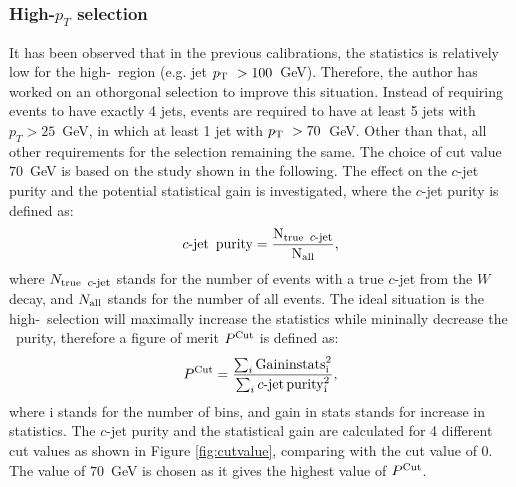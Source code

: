 \documentclass[letterpaper,12pt]{article}
\newcommand\cjetineq{\mathop{\mbox{$c$-$\rm{jet}$}}}
\newcommand\cjetunder{\mathop{\footnotesize{\mbox{$c$-$\rm{jet}$}}}\normalsize}
\begin{document}
\subsubsection{High-$p_T$ selection}
\label{high_pt_selection}
It has been observed that in the previous calibrations, the statistics 
is relatively low for the high-\pt\ region (e.g. jet $p_{\mathrm T}\ > 100$~GeV). 
Therefore, the author has worked on an othorgonal selection to improve this situation.
Instead of requiring events to have exactly 4 jets, events are required to 
have at least 5 jets with $p_{T} > 25$~GeV, in which at least 
1 jet with $p_{\mathrm T}\ > 70$~GeV. Other than that, all 
other requirements for the selection remaining the same. 
The choice of cut value $70$~GeV is based on the
study shown in the following. 
The effect on the $c$-jet purity and the potential statistical gain is investigated, 
where the $c$-jet purity is defined as:
\begin{equation}
\cjetineq\ \rm{purity} = \frac{N_{\rm{true}\ \cjetunder}}{N_{\rm{all}}},
\end{equation}
where $N_{\rm{true}\ \cjetunder}$ stands for the number of events with a 
true $c$-jet from the $W$ decay, and $N_{\rm{all}}$ stands for the number of all events. 
The ideal situation is the high-\pt\ selection will maximally increase the 
statistics while mininally decrease the \cjet\ purity, therefore a figure of merit $P^{\rm{Cut}}$
is defined as:
\[P^{\rm{Cut}} = \frac{\sum_i{\rm{Gain in stats}^2_i}}{\sum_i{\cjetineq \rm{purity}^2_i }}, \]
where i stands for the number of bins, and gain in stats stands for increase in 
statistics.
The $c$-jet purity and the statistical gain are calculated for 4 different cut 
values as shown in Figure \ref{fig:cutvalue}, comparing with the cut value of 0. 
The value of $70$~GeV is chosen as it gives the highest value of $P^{\rm{Cut}}$. 
\end{document}
